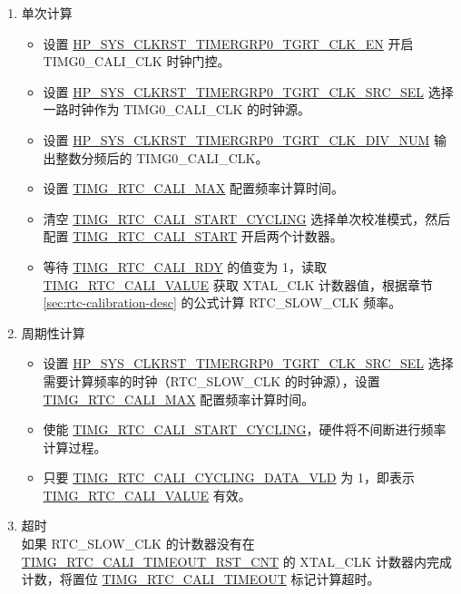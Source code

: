 \documentclass[main\_\_CN.tex]{subfiles}
\begin{document}
\begin{enumerate}
    \item 单次计算
    \begin{itemize}
         \item 设置 \hyperref[fielddesc:HPSYSCLKRSTTIMERGRP0TGRTCLKEN]{HP\_SYS\_CLKRST\_TIMERGRP0\_TGRT\_CLK\_EN} 开启 TIMG0\_CALI\_CLK 时钟门控。
         \item 设置 \hyperref[fielddesc:HPSYSCLKRSTTIMERGRP0TGRTCLKSRCSEL]{HP\_SYS\_CLKRST\_TIMERGRP0\_TGRT\_CLK\_SRC\_SEL} 选择一路时钟作为 TIMG0\_CALI\_CLK 的时钟源。
         \item 设置 \hyperref[fielddesc:HPSYSCLKRSTTIMERGRP0TGRTCLKDIVNUM]{HP\_SYS\_CLKRST\_TIMERGRP0\_TGRT\_CLK\_DIV\_NUM} 输出整数分频后的 TIMG0\_CALI\_CLK。
        \item 设置 \hyperref[fielddesc:TIMGRTCCALIMAX]{TIMG\_RTC\_CALI\_MAX} 配置频率计算时间。
        \item 清空 \hyperref[fielddesc:TIMGRTCCALISTARTCYCLING]{TIMG\_RTC\_CALI\_START\_CYCLING} 选择单次校准模式，然后配置 \hyperref[fielddesc:TIMGRTCCALISTART]{TIMG\_RTC\_CALI\_START} 开启两个计数器。
        \item 等待  \hyperref[fielddesc:TIMGRTCCALIRDY]{TIMG\_RTC\_CALI\_RDY} 的值变为 1，读取 \hyperref[fielddesc:TIMGRTCCALIVALUE]{TIMG\_RTC\_CALI\_VALUE} 获取 XTAL\_CLK 计数器值，根据章节 \ref{sec:rtc-calibration-desc} 的公式计算 RTC\_SLOW\_CLK 频率。
    \end{itemize}
    \item 周期性计算
    \begin{itemize}
        \item 设置 \hyperref[fielddesc:HPSYSCLKRSTTIMERGRP0TGRTCLKSRCSEL]{HP\_SYS\_CLKRST\_TIMERGRP0\_TGRT\_CLK\_SRC\_SEL} 选择需要计算频率的时钟（RTC\_SLOW\_CLK 的时钟源），设置 \hyperref[fielddesc:TIMGRTCCALIMAX]{TIMG\_RTC\_CALI\_MAX} 配置频率计算时间。
        \item 使能 \hyperref[fielddesc:TIMGRTCCALISTARTCYCLING]{TIMG\_RTC\_CALI\_START\_CYCLING}，硬件将不间断进行频率计算过程。
        \item 只要 \hyperref[fielddesc:TIMGRTCCALICYCLINGDATAVLD]{TIMG\_RTC\_CALI\_CYCLING\_DATA\_VLD} 为 1，即表示 \hyperref[fielddesc:TIMGRTCCALIVALUE]{TIMG\_RTC\_CALI\_VALUE} 有效。
    \end{itemize}
    \item 超时\\
    如果 RTC\_SLOW\_CLK 的计数器没有在 \hyperref[fielddesc:TIMGRTCCALITIMEOUTRSTCNT]{TIMG\_RTC\_CALI\_TIMEOUT\_RST\_CNT} 的 XTAL\_CLK 计数器内完成计数，将置位 \hyperref[fielddesc:TIMGRTCCALITIMEOUT]{TIMG\_RTC\_CALI\_TIMEOUT} 标记计算超时。
\end{enumerate}
\end{document}
